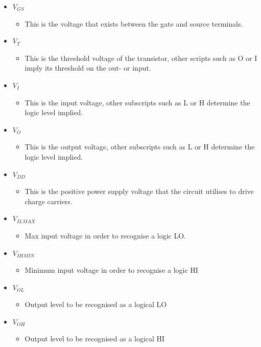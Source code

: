 \documentclass[12pt]{article}
\begin{document}
\begin{itemize}
\begin{itemize}
\end{itemize}
\item $V_{GS}$
\begin{itemize}
\item This is the voltage that exists between the gate and source terminals.
\end{itemize}
\item $V_T$
\begin{itemize}
\item This is the threshold voltage of the transistor, other scripts such as O or I imply its threshold on the out- or input.
\end{itemize}
\item $V_{I}$
\begin{itemize}
\item This is the input voltage, other subscripts such as L or H determine the logic level implied.
\end{itemize}
\item $V_O$
\begin{itemize}
\item This is the output voltage, other subscripts such as L or H determine the logic level implied.
\end{itemize}
\item $V_{DD}$
\begin{itemize}
\item This is the positive power supply voltage that the circuit utilises to drive charge carriers.
\end{itemize}
\item $V_{IL MAX}$
\begin{itemize}
\item Max input voltage in order to recognise a logic LO.
\end{itemize}
\item $V_{IH MIN}$
\begin{itemize}
\item Minimum input voltage in order to recognise a logic HI
\end{itemize}
\item $V_{OL}$
\begin{itemize}
\item Output level to be recognised as a logical LO
\end{itemize}
\item $V_{OH}$
\begin{itemize}
\item Output level to be recognised as a logical HI
\end{itemize}

\end{itemize}
\end{document}
